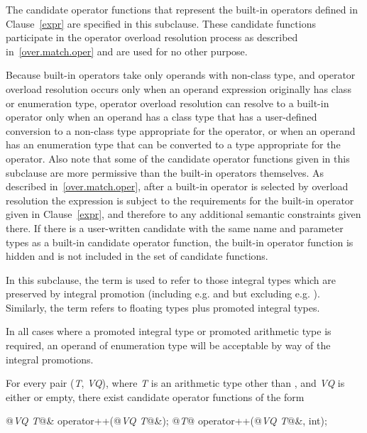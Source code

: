 \pnum
The candidate operator functions that represent the built-in operators
defined in Clause~\ref{expr} are specified in this subclause.
These candidate
functions participate in the operator overload resolution process as
described in~\ref{over.match.oper} and are used for no other purpose.
\begin{note}
Because built-in operators take only operands with non-class type,
and operator overload resolution occurs only when an operand expression
originally has class or enumeration type,
operator overload resolution can resolve to a built-in operator only
when an operand has a class type that has a user-defined conversion to
a non-class type appropriate for the operator, or when an operand has
an enumeration type that can be converted to a type appropriate
for the operator.
Also note that some of the candidate operator functions given in this subclause are
more permissive than the built-in operators themselves.
As
described in~\ref{over.match.oper}, after a built-in operator is selected
by overload resolution the expression is subject to the requirements for
the built-in operator given in Clause~\ref{expr}, and therefore to any
additional semantic constraints given there.
If there is a user-written
candidate with the same name and parameter types as a built-in
candidate operator function, the built-in operator function
is hidden and is not included in the set of candidate functions.
\end{note}

\pnum
In this subclause, the term
is used to refer to those integral types which are preserved by
integral promotion (including e.g.
and
but excluding e.g.
).
Similarly, the term
refers to floating types plus promoted integral types.
\begin{note}
In all cases where a promoted integral type or promoted arithmetic type is
required, an operand of enumeration type will be acceptable by way of the
integral promotions.
\end{note}

\pnum
For every pair
(\textit{T},
\textit{VQ}),
where
\textit{T}
is an arithmetic type other than , and
\textit{VQ}
is either
or empty,
there exist candidate operator functions of the form

\begin{codeblock}
@\textit{VQ T}@& operator++(@\textit{VQ T}@&);
@\textit{T}@ operator++(@\textit{VQ T}@&, int);
\end{codeblock}

